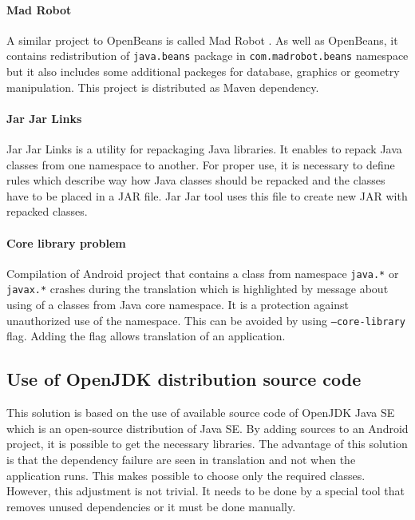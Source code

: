 \paragraph{Mad Robot}
A similar project to OpenBeans is called Mad Robot \cite{MadRobot}. As well as OpenBeans, it contains redistribution of
\texttt{java.beans} package in \texttt{com.madrobot.beans} namespace but it also includes some additional packeges for
database, graphics or geometry manipulation. This project is distributed as Maven dependency.

\paragraph{Jar Jar Links}
Jar Jar Links \cite{JarJar} is a utility for repackaging Java libraries. It enables to repack Java classes from one
namespace to another. For proper use, it is necessary to define rules which describe way how Java classes should be
repacked and the classes have to be placed in a JAR file. Jar Jar tool uses this file to create new JAR with repacked
classes.

\paragraph{Core library problem}
Compilation of Android project that contains a class from namespace \texttt{java.*} or \texttt{javax.*} crashes during
the translation which is highlighted by message about using of a classes from Java core namespace. It is a protection
against unauthorized use of the namespace. This can be avoided by using \texttt{--core-library} flag. Adding the flag
allows translation of an application.

\subsection{Use of OpenJDK distribution source code}\label{OpenJdkDistrSection}
This solution is based on the use of available source code of OpenJDK Java SE \cite{OpenJDK} which is an open-source
distribution of Java SE. By adding sources to an Android project, it is possible to get the necessary libraries. The
advantage of this solution is that the dependency failure are seen in translation and not when the application runs.
This makes possible to choose only the required classes. However, this adjustment is not trivial. It needs to be done by
a special tool that removes unused dependencies or it must be done manually.

